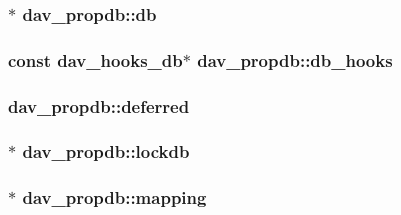 \subsubsection[{\texorpdfstring{db}{db}}]{$\ast$ dav\+\_\+propdb\+::db}\hypertarget{structdav__propdb_a49ea8f1bcbc105b8ce0b9b79707cb2d7}{}\label{structdav__propdb_a49ea8f1bcbc105b8ce0b9b79707cb2d7}
\subsubsection[{\texorpdfstring{db\+\_\+hooks}{db_hooks}}]{\setlength{\rightskip}{0pt plus 5cm}const {\bf dav\+\_\+hooks\+\_\+db}$\ast$ dav\+\_\+propdb\+::db\+\_\+hooks}\hypertarget{structdav__propdb_a1e52f1dc673f63827c00e13a651329f3}{}\label{structdav__propdb_a1e52f1dc673f63827c00e13a651329f3}
\subsubsection[{\texorpdfstring{deferred}{deferred}}]{ dav\+\_\+propdb\+::deferred}\hypertarget{structdav__propdb_a5fc44d255b4349337a30308e3dd22ed2}{}\label{structdav__propdb_a5fc44d255b4349337a30308e3dd22ed2}
\subsubsection[{\texorpdfstring{lockdb}{lockdb}}]{$\ast$ dav\+\_\+propdb\+::lockdb}\hypertarget{structdav__propdb_af6bc223f74019af9d86189737b3b59b9}{}\label{structdav__propdb_af6bc223f74019af9d86189737b3b59b9}
\subsubsection[{\texorpdfstring{mapping}{mapping}}]{$\ast$ dav\+\_\+propdb\+::mapping}\hypertarget{structdav__propdb_a28383422023a9d7f3407c3a19138fd37}{}\label{structdav__propdb_a28383422023a9d7f3407c3a19138fd37}
